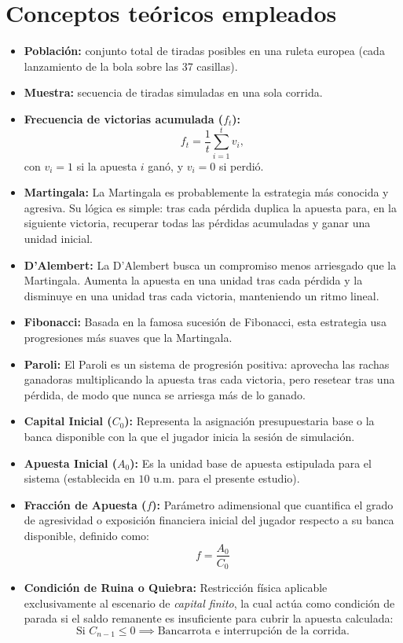 \documentclass{article}
\begin{document}
\section{Conceptos teóricos empleados}
\begin{itemize}
  \item \textbf{Población:} conjunto total de tiradas posibles en una ruleta europea (cada lanzamiento de la bola sobre las 37 casillas).
  \item \textbf{Muestra:} secuencia de tiradas simuladas en una sola corrida.
  \item \textbf{Frecuencia de victorias acumulada ($f_t$):}
    \[
      f_t = \frac{1}{t}\sum_{i=1}^{t} v_i,
    \]
    con $v_i=1$ si la apuesta $i$ ganó, y $v_i=0$ si perdió.
  \item \textbf{Martingala:} La Martingala es probablemente la estrategia más conocida y agresiva. Su lógica es simple: tras cada pérdida duplica la apuesta para, en la siguiente victoria, recuperar todas las pérdidas acumuladas y ganar una unidad inicial.
  
  \item \textbf{D’Alembert:} La D’Alembert busca un compromiso menos arriesgado que la Martingala. Aumenta la apuesta en una unidad tras cada pérdida y la disminuye en una unidad tras cada victoria, manteniendo un ritmo lineal.
  
  \item \textbf{Fibonacci:} Basada en la famosa sucesión de Fibonacci, esta estrategia usa progresiones más suaves que la Martingala.
  
  \item \textbf{Paroli:} El Paroli es un sistema de progresión positiva: aprovecha las rachas ganadoras multiplicando la apuesta tras cada victoria, pero resetear tras una pérdida, de modo que nunca se arriesga más de lo ganado.
    \item \textbf{Capital Inicial ($C_0$):} Representa la asignación presupuestaria base o la banca disponible con la que el jugador inicia la sesión de simulación.
    \item \textbf{Apuesta Inicial ($A_0$):} Es la unidad base de apuesta estipulada para el sistema (establecida en $10$ u.m. para el presente estudio).
    \item \textbf{Fracción de Apuesta ($f$):} Parámetro adimensional que cuantifica el grado de agresividad o exposición financiera inicial del jugador respecto a su banca disponible, definido como:
    \begin{equation}
        f = \frac{A_0}{C_0}
    \end{equation}
    \item \textbf{Condición de Ruina o Quiebra:} Restricción física aplicable exclusivamente al escenario de \textit{capital finito}, la cual actúa como condición de parada si el saldo remanente es insuficiente para cubrir la apuesta calculada:
    \begin{equation}
        \text{Si } C_{n-1} \le 0 \implies \text{Bancarrota e interrupción de la corrida.}
    \end{equation}
\end{itemize}
\end{document}
